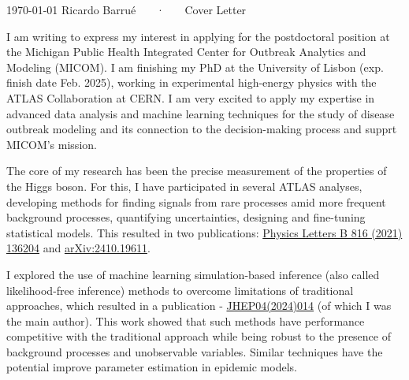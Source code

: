 \documentclass[11pt, a4paper]{awesome-cv}
\begin{document}
\makecvheader[R]

\makecvfooter
  {\today}
  {Ricardo Barrué ~~~·~~~ Cover Letter}
  {}

\makelettertitle

\begin{cvletter}

I am writing to express my interest in applying for the postdoctoral position at the Michigan Public Health Integrated Center for Outbreak Analytics and Modeling (MICOM). I am finishing my PhD at the University of Lisbon (exp. finish date Feb. 2025), working in experimental high-energy physics with the ATLAS Collaboration at CERN. I am very excited to apply my expertise in advanced data analysis and machine learning techniques for the study of disease outbreak modeling and its connection to the decision-making process and supprt MICOM's mission.

The core of my research has been the precise measurement of the properties of the Higgs boson. For this, I have participated in several ATLAS analyses, developing methods for finding signals from rare processes amid more frequent background processes, quantifying uncertainties, designing and fine-tuning statistical models. This resulted in two publications: \href{https://doi.org/10.1016/j.physletb.2021.136204}{Physics Letters B 816 (2021) 136204} and \href{https://arxiv.org/abs/2410.19611}{arXiv:2410.19611}. 

I explored the use of machine learning simulation-based inference (also called likelihood-free inference) methods to overcome limitations of traditional approaches, which resulted in a publication - \href{http://dx.doi.org/10.1007/JHEP04(2024)014}{JHEP04(2024)014} (of which I was the main author). This work showed that such methods have performance competitive with the traditional approach while being robust to the presence of background processes and unobservable variables. Similar techniques have the potential improve parameter estimation in epidemic models.



\end{cvletter}
\end{document}
